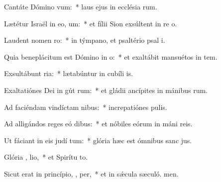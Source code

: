 \item Cantáte Dómino  vum:~* laus ejus in ecclésia rum.
\item Lætétur Israël in eo,   um:~* et fílii Sion exsúltent in re o.
\item Laudent nomen   ro:~* in týmpano, et psaltério psal i.
\item Quia beneplácitum est Dómino in  o:~* et exaltábit mansuétos in tem.
\item Exsultábunt   ria:~* lætabúntur in cubíli is.
\item Exaltatiónes Dei in gút rum:~* et gládii ancípites in mánibus rum.
\item Ad faciéndam vindíctam  nibus:~* increpatiónes  pulis.
\item Ad alligándos reges eó  dibus:~* et nóbiles eórum in máni reis.
\item Ut fáciant in eis judí tum:~* glória hæc est ómnibus sanc jus.
\item Glória ,  lio,~* et Spirítu to.
\item Sicut erat in princípio,  ,  per,~* et in sǽcula sæculó. men.
